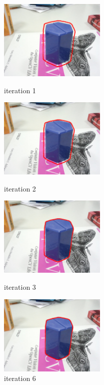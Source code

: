 \begin{figure} 
  \begin{minipage}[t]{0.45\linewidth} 
    \centering 
    \includegraphics[width=2.0in]{images/container/0.png} 
    \caption{iteration 1} 
    \label{fig:side:a} 
  \end{minipage}%
  \begin{minipage}[t]{0.45\linewidth} 
    \centering 
    \includegraphics[width=2.0in]{images/container/1.png} 
    \caption{iteration 2} 
    \label{fig:side:b} 
  \end{minipage} 
  \begin{minipage}[t]{0.45\linewidth} 
    \centering 
    \includegraphics[width=2.0in]{images/container/2.png} 
    \caption{iteration 3} 
    \label{fig:side:c} 
  \end{minipage} 
  \begin{minipage}[t]{0.45\linewidth} 
    \centering 
    \includegraphics[width=2.0in]{images/container/5.png} 
    \caption{iteration 6} 
    \label{fig:side:d} 
  \end{minipage} 
\end{figure}

